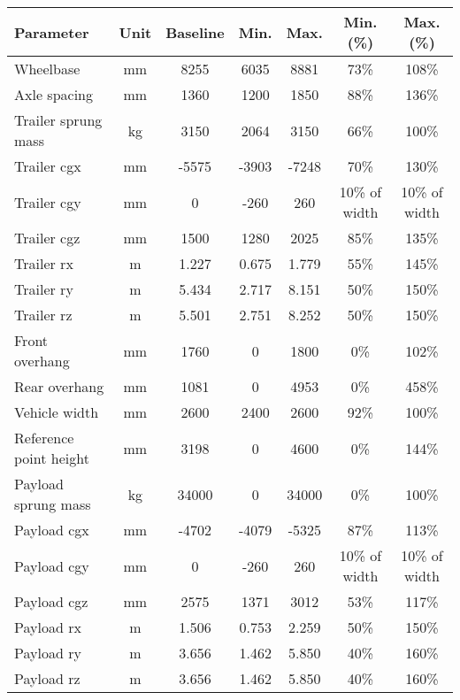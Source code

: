 \begin{table}[H]
	\centering\footnotesize
	\begin{threeparttable}

		\begin{tabulary}{\textwidth}{lcccccc}
			\toprule
			\textbf{Parameter} & \textbf{Unit} & \textbf{Baseline} & \textbf{Min.} & \textbf{Max.} & \textbf{Min. (\%)} & \textbf{Max. (\%)} \\

			\midrule
			Wheelbase & mm & 8255  & 6035  & 8881  & 73\%  & 108\% \\
			Axle spacing & mm    & 1360  & 1200  & 1850  & 88\%  & 136\% \\
			Trailer sprung mass & kg    & 3150  & 2064  & 3150  & 66\%  & 100\% \\
			Trailer \gls{cgx} & mm    & -5575  & -3903  & -7248  & 70\%  & 130\% \\
			Trailer \gls{cgy} & mm    & 0     & -260  & 260   & 10\% of width & 10\% of width \\
			Trailer \gls{cgz} & mm    & 1500  & 1280  & 2025  & 85\%  & 135\% \\
			Trailer \gls{rx} & m     & 1.227 & 0.675 & 1.779 & 55\%  & 145\% \\
			Trailer \gls{ry} & m     & 5.434 & 2.717 & 8.151 & 50\%  & 150\% \\
			Trailer \gls{rz} & m     & 5.501 & 2.751 & 8.252 & 50\%  & 150\% \\
			Front overhang & mm & 1760  & 0     & 1800  & 0\%   & 102\% \\
			Rear overhang & mm & 1081  & 0     & 4953  & 0\%   & 458\% \\
			Vehicle width & mm    & 2600  & 2400  & 2600  & 92\%  & 100\% \\
			Reference point height & mm    & 3198  & 0     & 4600  & 0\%   & 144\% \\
			Payload sprung mass & kg    & 34000 & 0     & 34000 & 0\%   & 100\% \\
			Payload \gls{cgx} & mm    & -4702  & -4079  & -5325  & 87\%  & 113\% \\
			Payload \gls{cgy} & mm    & 0     & -260  & 260   & 10\% of width & 10\% of width \\
			Payload \gls{cgz} & mm    & 2575  & 1371  & 3012  & 53\%  & 117\% \\
			Payload \gls{rx} & m     & 1.506 & 0.753 & 2.259 & 50\%  & 150\% \\
			Payload \gls{ry} & m     & 3.656 & 1.462 & 5.850 & 40\%  & 160\% \\
			Payload \gls{rz} & m     & 3.656 & 1.462 & 5.850 & 40\%  & 160\% \\


\end{tabulary}
\end{threeparttable}
\end{table}

